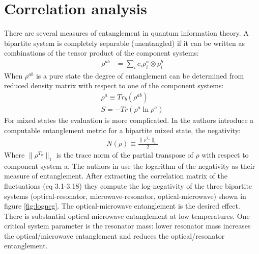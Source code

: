 \documentclass[a4paper,11pt, twocolumn]{article}
\numberwithin{equation}{section}
\begin{document}
\section{Correlation analysis}
There are several measures of entanglement in quantum information theory. 
A bipartite system is completely separable (unentangled) if it can be written as combinations of the tensor product of the component systems:
\begin{align}
 \rho^{ab} &= \sum_i c_i \rho_i^a \otimes \rho_i^b
\end{align}
When $\rho^{ab}$ is a pure state the degree of entanglement can be determined from reduced density matrix with respect to one of the component systems:
\begin{align}
 \rho^a \equiv Tr_b(\rho^{ab} )\\
 S = -Tr(\rho^a\ln{\rho^a} )
\end{align}
For mixed states the evaluation is more complicated. 
In \cite{qent} the authors introduce a computable entanglement metric for a bipartite mixed state, the negativity:
\begin{align}
 N(\rho) \equiv \frac{\|\rho^{T_a}\|_1}{2}
\end{align}
Where $\|\rho^{T_a}\|_1$ is the trace norm of the partial transpose of $\rho$ with respect to component system a.
The authors in \cite{nanoMR} use the logarithm of the negativity as their measure of entanglement. 
After extracting the correlation matrix of the fluctuations (eq 3.1-3.18) they compute the log-negativity of the three bipartite systems (optical-resonator, microwave-resonator, optical-microwave) shown in figure \ref{fig:logneg}.
The optical-microwave entanglement is the desired effect. 
There is substantial optical-microwave entanglement at low temperatures.
One critical system parameter is the resonator mass: lower resonator mass increases the optical/microwave entanglement and reduces the optical/resonator entanglement. 
\end{document}
